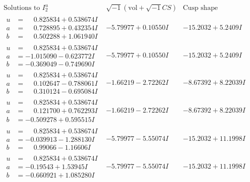 \documentclass[1p]{elsarticle_modified}
\theoremstyle{definition}
\newcommand{\I}{\sqrt{-1}}
\begin{document}
$$\begin{array}{c|c|c}  
\text{Solutions to }I^u_{2}& \I (\text{vol} + \sqrt{-1}CS) & \text{Cusp shape}\\
 \hline 
\begin{aligned}
u &= \phantom{-}0.825834 + 0.538674 I \\
a &= \phantom{-}0.728895 + 0.432354 I \\
b &= \phantom{-}0.502288 + 1.061940 I\end{aligned}
 & -5.79977 + 0.10550 I & -15.2032 + 5.2409 I \\ \hline\begin{aligned}
u &= \phantom{-}0.825834 + 0.538674 I \\
a &= -1.015090 - 0.623772 I \\
b &= -0.369049 - 0.749690 I\end{aligned}
 & -5.79977 + 0.10550 I & -15.2032 + 5.2409 I \\ \hline\begin{aligned}
u &= \phantom{-}0.825834 + 0.538674 I \\
a &= \phantom{-}0.102647 - 0.788061 I \\
b &= \phantom{-}0.310124 - 0.695084 I\end{aligned}
 & -1.66219 - 2.72262 I & -8.67392 + 8.22039 I \\ \hline\begin{aligned}
u &= \phantom{-}0.825834 + 0.538674 I \\
a &= \phantom{-}0.121700 + 0.762293 I \\
b &= -0.509278 + 0.595515 I\end{aligned}
 & -1.66219 - 2.72262 I & -8.67392 + 8.22039 I \\ \hline\begin{aligned}
u &= \phantom{-}0.825834 + 0.538674 I \\
a &= -0.039913 - 1.288130 I \\
b &= \phantom{-}0.99066 - 1.16606 I\end{aligned}
 & -5.79977 - 5.55074 I & -15.2032 + 11.1998 I \\ \hline\begin{aligned}
u &= \phantom{-}0.825834 + 0.538674 I \\
a &= -0.19543 + 1.53945 I \\
b &= -0.660921 + 1.085280 I\end{aligned}
 & -5.79977 - 5.55074 I & -15.2032 + 11.1998 I \\ \hline\begin{aligned}

\end{aligned}
\end{array}$$
\end{document}
